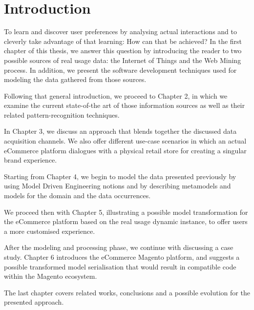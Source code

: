 
\chapter*{Introduction}

To learn and discover user preferences by analysing actual interactions and to cleverly take advantage of that learning: How can that be achieved? In the first chapter of this thesis, we answer this question by introducing the reader to two possible sources of real usage data: the Internet of Things and the Web Mining process. In addition, we present the software development techniques used for modeling the data gathered from those sources.

Following that general introduction, we proceed to Chapter 2, in which we examine the current state-of-the art of those information sources as well as their related pattern-recognition techniques.

In Chapter 3, we discuss an approach that blends together the discussed data acquisition channels. We also offer different use-case scenarios in which an actual eCommerce platform dialogues with a physical retail store for creating a singular brand experience.

Starting from Chapter 4, we begin to model the data presented previously by using Model Driven Engineering notions and by describing metamodels and models for the domain and the data occurrences. 

We proceed then with Chapter 5, illustrating a possible model transformation for the eCommerce platform based on the real usage dynamic instance, to offer users a more customised experience.

After the modeling and processing phase, we continue with discussing a case study. Chapter 6 introduces the eCommerce Magento platform, and suggests a possible transformed model serialisation that would result in compatible code within the Magento ecosystem.

The last chapter covers related works, conclusions and a possible evolution for the presented approach.

